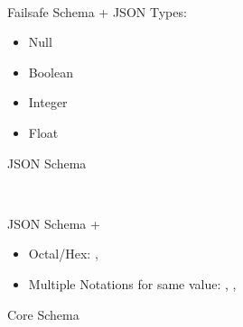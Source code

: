 \begin{figure}[H]
  \begin{minipage}[t]{0.48\textwidth}
    \vspace{0pt}
    \begin{bchart}[max=9, width=0.85\textwidth]
    \end{bchart}
  \end{minipage}
  \begin{minipage}[t]{0pt}~\end{minipage}
  \begin{minipage}[t]{0.48\textwidth}
    \vspace{0pt}
    Failsafe Schema + JSON Types:
    \begin{itemize}
      \item Null
      \item Boolean
      \item Integer
      \item Float
    \end{itemize}
  \end{minipage}
  \caption{JSON Schema}
\end{figure}

\begin{figure}[H]
  \begin{minipage}[t]{0.48\textwidth}
    \vspace{0pt}
    \begin{bchart}[max=9, width=0.85\textwidth]
    \end{bchart}
  \end{minipage}
  \begin{minipage}[t]{0pt}~\end{minipage}
  \begin{minipage}[t]{0.48\textwidth}
    \vspace{0pt}
    JSON Schema +
    \begin{itemize}
      \item Octal/Hex: , 
      \item Multiple Notations for same value:
            , , \code{~}
    \end{itemize}
  \end{minipage}
  \caption{Core Schema}
\end{figure}

